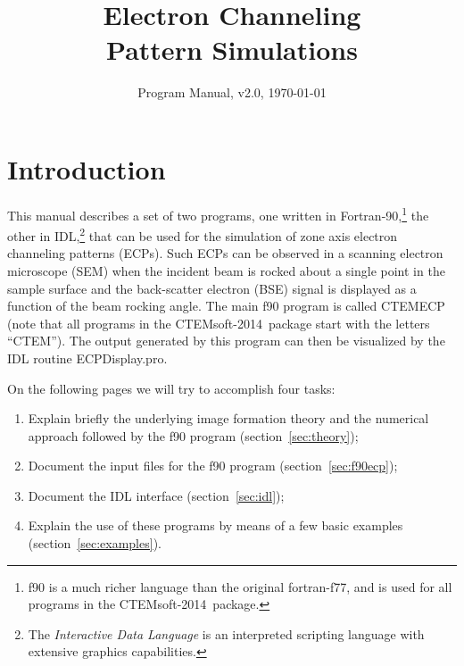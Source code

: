 \documentclass[DIV=calc, paper=letter, fontsize=11pt]{scrartcl}	 %
\title{Electron Channeling\\ Pattern Simulations} %
\author{\vspace*{-0.7in}} %
\date{Program Manual, v2.0, \today}
\newcommand{\ctp}{\textsf{CTEMsoft-2014}}
\begin{document}
\maketitle

\begin{figure*}[h]
\leavevmode\centering
{}
\end{figure*}

\renewcommand{\contentsname}{Table of Contents}
{\small\tableofcontents}

\newpage
\section{Introduction}
This manual describes a set of two programs, 
one written in Fortran-90,\footnote{f90 is a much richer language than the original fortran-f77, and is
used for all programs in the \ctp\ package.} 
the other in IDL,\footnote{The \textit{Interactive Data Language} is an interpreted scripting language with extensive graphics capabilities.} 
that can be used for the simulation of zone axis electron channeling patterns (ECPs).  Such ECPs can be
observed in a scanning electron microscope (SEM) when the incident beam is rocked about a single point in the sample surface and 
the back-scatter electron (BSE) signal is displayed as a function of the beam rocking angle.  The main f90 program
is called \textsf{CTEMECP} (note that all programs in the \ctp\ package start with the letters ``CTEM'').
The output generated by this program can then be visualized by the IDL routine \textsf{ECPDisplay.pro}.  

On the following pages we will try to accomplish four tasks:
\begin{enumerate}
	\item Explain briefly the underlying image formation theory and the numerical approach followed by the f90 program (section~\ref{sec:theory});
	\item Document the input files for the f90 program (section~\ref{sec:f90ecp});
	\item Document the IDL interface (section~\ref{sec:idl});
	\item Explain the use of these programs by means of a few basic examples (section~\ref{sec:examples}).
\end{enumerate}



\newpage
\end{document}
